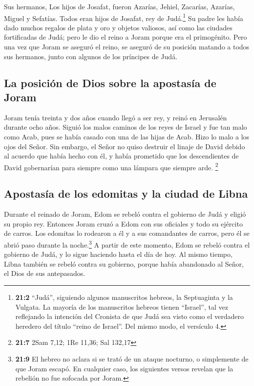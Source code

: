  Sus hermanos, Los hijos de Josafat, fueron Azarías,
Jehiel, Zacarías, Azarías, Miguel y Sefatías. Todos eran hijos de
Josafat, rey de Judá.\footnote{\textbf{21:2} ``Judá'', siguiendo algunos
  manuscritos hebreos, la Septuaginta y la Vulgata. La mayoría de los
  manuscritos hebreos tienen ``Israel'', tal vez reflejando la intención
  del Cronista de que Judá sea visto como el verdadero heredero del
  título ``reino de Israel''. Del mismo modo, el versículo 4.}
 Su padre les había dado muchos regalos de plata y oro y
objetos valiosos, así como las ciudades fortificadas de Judá; pero le
dio el reino a Joram porque era el primogénito.  Pero una
vez que Joram se aseguró el reino, se aseguró de su posición matando a
todos sus hermanos, junto con algunos de los príncipes de Judá.

\hypertarget{la-posiciuxf3n-de-dios-sobre-la-apostasuxeda-de-joram}{%
\subsection{La posición de Dios sobre la apostasía de
Joram}\label{la-posiciuxf3n-de-dios-sobre-la-apostasuxeda-de-joram}}

 Joram tenía treinta y dos años cuando llegó a ser rey, y
reinó en Jerusalén durante ocho años.  Siguió los malos
caminos de los reyes de Israel y fue tan malo como Acab, pues se había
casado con una de las hijas de Acab. Hizo lo malo a los ojos del Señor.
 Sin embargo, el Señor no quiso destruir el linaje de
David debido al acuerdo que había hecho con él, y había prometido que
los descendientes de David gobernarían para siempre como una lámpara que
siempre arde. \footnote{\textbf{21:7} 2Sam 7,12; 1Re 11,36; Sal 132,17}

\hypertarget{apostasuxeda-de-los-edomitas-y-la-ciudad-de-libna}{%
\subsection{Apostasía de los edomitas y la ciudad de
Libna}\label{apostasuxeda-de-los-edomitas-y-la-ciudad-de-libna}}

 Durante el reinado de Joram, Edom se rebeló contra el
gobierno de Judá y eligió su propio rey.  Entonces Joram
cruzó a Edom con sus oficiales y todo su ejército de carros. Los
edomitas lo rodearon a él y a sus comandantes de carros, pero él se
abrió paso durante la noche.\footnote{\textbf{21:9} El hebreo no aclara
  si se trató de un ataque nocturno, o simplemente de que Joram escapó.
  En cualquier caso, los siguientes versos revelan que la rebelión no
  fue sofocada por Joram.}  A partir de este momento,
Edom se rebeló contra el gobierno de Judá, y lo sigue haciendo hasta el
día de hoy. Al mismo tiempo, Libna también se rebeló contra su gobierno,
porque había abandonado al Señor, el Dios de sus antepasados.

